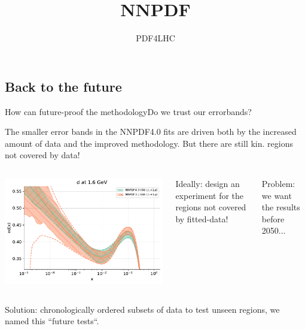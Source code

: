 \newcommand{\hlme}[1]{{\color{red}\bf #1}}

\title{NNPDF}
\author[Juan Cruz-Martinez]{}
\date{PDF4LHC}

\subsection{Back to the future}

\begin{frame}{How can future-proof the methodology}{Do we trust our errorbands?}

    \small
    The smaller error bands in the NNPDF4.0 fits are driven both by the increased amount of data and the
    improved methodology.
    But there are still kin. regions not covered by data!

    \begin{columns}
        \includegraphics[width=1.0\textwidth]{juan_future_hyperopt/dquark.pdf}

         \vspace{-2.3cm} {

            Ideally: design an experiment for the regions not covered by fitted-data!

            \vspace{0.3cm}

            Problem: we want the results before 2050...

        }
    \end{columns}

    \vspace{-0.3cm}

    \begin{columns}
        Solution: chronologically ordered subsets of data to test unseen regions, we named this ``future tests``.


\end{columns}
\end{frame}
